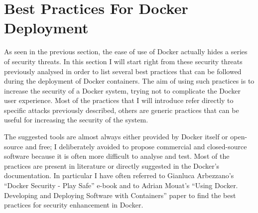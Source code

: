 \documentclass[a4paper,12pt]{article}
\begin{document}




\newpage

\section{Best Practices For Docker Deployment}
\label{sec:best_practices_for_docker_deployment}

As seen in the previous section, the ease of use of Docker actually hides a
series of security threats. In this section I will start right from these
security threats previously analysed in order to list several best practices
that can be followed during the deployment of Docker containers. The aim of
using such practices is to increase the security of a Docker system, trying not
to complicate the Docker user experience. Most of the practices that I will
introduce refer directly to specific attacks previously described, others are
generic practices that can be useful for increasing the security of the system.
\par The suggested tools are almost always either provided by Docker itself or
open-source and free; I deliberately avoided to propose commercial and
closed-source software because it is often more difficult to analyse and test.
Most of the practices are present in literature or directly suggested in the
Docker's documentation. In particular I have often referred to Gianluca
Arbezzano's ``Docker Security - Play Safe'' \cite{arbezzano_play_safe} e-book and
to Adrian Mouat's ``Using Docker. Developing and Deploying Software with
Containers'' \cite{mouat_using_docker} paper to find the best practices for
security enhancement in Docker. 
\end{document}
